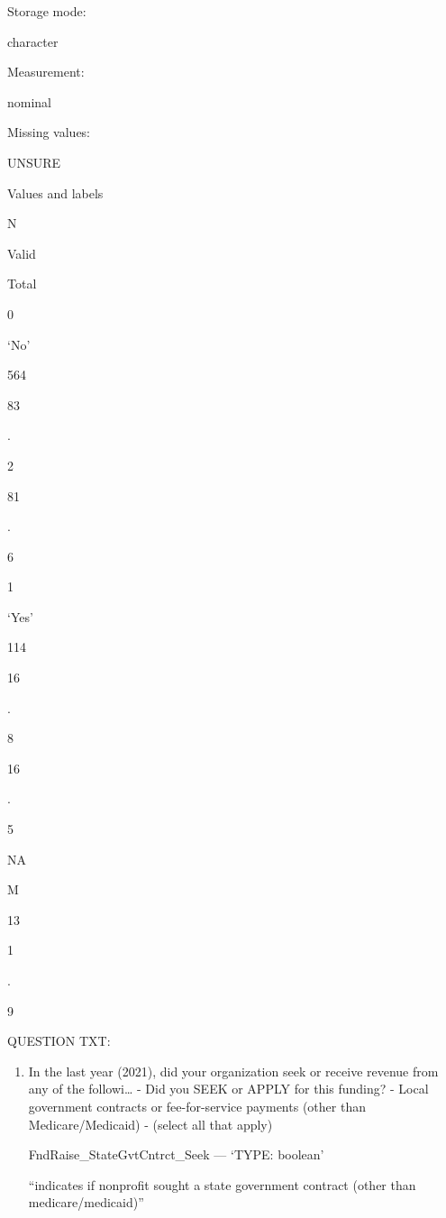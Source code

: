 \documentclass[
  letterpaper,
]{scrbook}
\providecommand{\tightlist}{%
  \setlength{\itemsep}{0pt}\setlength{\parskip}{0pt}}\usepackage{longtable,booktabs,array}
\begin{document}
\begin{enumerate}
\begin{enumerate}
\begin{enumerate}
      Storage mode:

      character

      Measurement:

      nominal

      Missing values:

      UNSURE

      Values and labels

      N

      Valid

      Total

      0

      `No'

      564

      83

      .

      2

      81

      .

      6

      1

      `Yes'

      114

      16

      .

      8

      16

      .

      5

      NA

      M

      13

      1

      .

      9

      QUESTION TXT:

      \begin{enumerate}
      \def\labelenumiv{\arabic{enumiv}.}
      \setcounter{enumiv}{8}
      \tightlist
      \item
        In the last year (2021), did your organization seek or receive
        revenue from any of the followi\ldots{} - Did you SEEK or APPLY
        for this funding? - Local government contracts or
        fee-for-service payments (other than Medicare/Medicaid) -
        (select all that apply)

        FndRaise\_StateGvtCntrct\_Seek --- {`TYPE: boolean'}

        ``indicates if nonprofit sought a state government contract
        (other than medicare/medicaid)''


\end{enumerate}
\end{enumerate}
\end{enumerate}
\end{enumerate}
\end{document}
